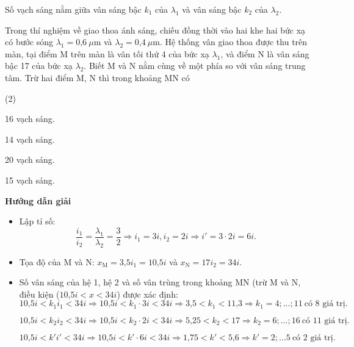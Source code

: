 \begin{dang}{Số vạch sáng nằm giữa vân sáng bậc $k_1$ của $\lambda_1$ và vân sáng bậc $k_2$ của $\lambda_2$.}
	{
		Trong thí nghiệm về giao thoa ánh sáng, chiếu đồng thời vào hai khe hai bức xạ có bước sóng $\lambda_1 = \text{0,6}\ \mu \text{m}$ và $\lambda_2 = \text{0,4}\ \mu \text{m}$. Hệ thống vân giao thoa được thu trên màn, tại điểm M trên màn là vân tối thứ 4 của bức xạ $\lambda_1$, và điểm N là vân sáng bậc 17 của bức xạ $\lambda_2$. Biết M và N nằm cùng về một phía so với vân sáng trung tâm. Trừ hai điểm M, N thì trong khoảng MN có
		\begin{mcq}(2)
			\item 16 vạch sáng. 	
			\item 14 vạch sáng.   	
			\item 20 vạch sáng. 	   
			\item 15 vạch sáng.
		\end{mcq}
	}
	{\begin{center}
			\textbf{Hướng dẫn giải}
		\end{center}
		
		\begin{itemize}
			\item Lập tỉ số: 
			\begin{equation*}
				\dfrac{i_1}{i_2}=\dfrac{\lambda_1}{\lambda_2}=\dfrac{3}{2} \Rightarrow i_1=3i, i_2=2i \Rightarrow i'=3\cdot 2i=6i.
			\end{equation*}
			\item Tọa độ của M và N: $x_{\text{M}}=\text{3,5}i_1=\text{10,5}i$ và $x_{\text{N}}=17i_2=34i$.
			\item Số vân sáng của hệ 1, hệ 2 và số vân trùng trong khoảng MN (trừ M và N, điều kiện ($\text{10,5}i < x < 34i$) được xác định: 
			\begin{equation*}
				\text{10,5}i < k_1i_1  < 34i \Rightarrow \text{10,5}i<k_1\cdot 3i<34i \Rightarrow \text{3,5}<k_1< \text{11,3} \Rightarrow k_1=4;...;11\ \text {có 8 giá trị}.
			\end{equation*}
			
			\begin{equation*}
				\text{10,5}i < k_2i_2  < 34i \Rightarrow \text{10,5}i<k_2\cdot 2i<34i \Rightarrow \text{5,25}<k_2< 17 \Rightarrow k_2=6;...;16\ \text {có 11 giá trị}.
			\end{equation*}
			
			\begin{equation*}
				\text{10,5}i < k'i'  < 34i \Rightarrow \text{10,5}i<k'\cdot 6i<34i \Rightarrow \text{1,75}<k'< \text{5,6} \Rightarrow k'=2;...5\ \text {có 2 giá trị}.
			\end{equation*}
			

\end{itemize}}
\end{dang}
